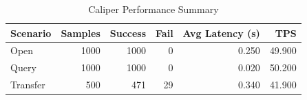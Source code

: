 \begin{table}
\caption{Caliper Performance Summary}
\label{tab:caliper_round}
\begin{tabular}{lrrrrr}
\toprule
Scenario & Samples & Success & Fail & Avg Latency (s) & TPS \\
\midrule
Open & 1000 & 1000 & 0 & 0.250 & 49.900 \\
Query & 1000 & 1000 & 0 & 0.020 & 50.200 \\
Transfer & 500 & 471 & 29 & 0.340 & 41.900 \\
\bottomrule
\end{tabular}
\end{table}
